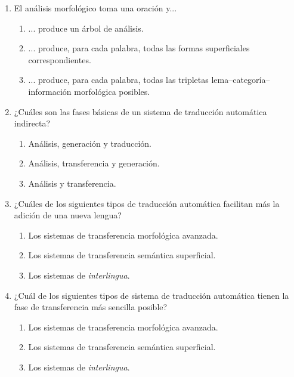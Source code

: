\begin{enumerate}
\item El análisis morfológico toma una oración y... \begin{enumerate} \item ... produce un árbol de análisis. \item ... produce, para cada palabra, todas las formas superficiales correspondientes. \item ... produce, para cada palabra, todas las tripletas lema--categoría--información morfológica posibles. \end{enumerate} 

\item ¿Cuáles son las fases básicas de un sistema de traducción automática indirecta? \begin{enumerate} \item Análisis, generación y traducción. \item Análisis, transferencia y generación. \item Análisis y transferencia. \end{enumerate} 

\item ¿Cuáles de los siguientes tipos de traducción automática facilitan más la adición de una nueva lengua? \begin{enumerate} \item Los sistemas de transferencia morfológica avanzada. \item Los sistemas de transferencia semántica superficial. \item Los sistemas de \emph{interlingua}. \end{enumerate} 

\item ¿Cuál de los siguientes tipos de sistema de traducción automática tienen la fase de transferencia más sencilla posible? \begin{enumerate} \item Los sistemas de transferencia morfológica avanzada. \item Los sistemas de transferencia semántica superficial. \item Los sistemas de \emph{interlingua}. \end{enumerate} 


\end{enumerate}
